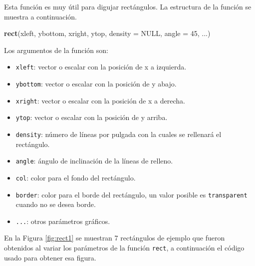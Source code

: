 \documentclass[10pt,]{krantz}
\makeatletter
\newenvironment{Shaded}{\begin{snugshade}}{\end{snugshade}}
\newcommand{\KeywordTok}[1]{\textcolor[rgb]{0.13,0.29,0.53}{\textbf{#1}}}
\newcommand{\DataTypeTok}[1]{\textcolor[rgb]{0.13,0.29,0.53}{#1}}
\newcommand{\DecValTok}[1]{\textcolor[rgb]{0.00,0.00,0.81}{#1}}
\newcommand{\OtherTok}[1]{\textcolor[rgb]{0.56,0.35,0.01}{#1}}
\newcommand{\NormalTok}[1]{#1}
\providecommand{\tightlist}{%
  \setlength{\itemsep}{0pt}\setlength{\parskip}{0pt}}
\newenvironment{kframe}{%
\medskip{}
\setlength{\fboxsep}{.8em}
 \def\at@end@of@kframe{}%
 \ifinner\ifhmode%
  \def\at@end@of@kframe{\end{minipage}}%
  \begin{minipage}{\columnwidth}%
 \fi\fi%
 \def\FrameCommand##1{\hskip\@totalleftmargin \hskip-\fboxsep
 \colorbox{shadecolor}{##1}\hskip-\fboxsep
     \hskip-\linewidth \hskip-\@totalleftmargin \hskip\columnwidth}%
 \MakeFramed {\advance\hsize-\width
   \@totalleftmargin\z@ \linewidth\hsize
   \@setminipage}}%
 {\par\unskip\endMakeFramed%
 \at@end@of@kframe}
\renewenvironment{Shaded}{\begin{kframe}}{\end{kframe}}
\makeatother
\begin{document}
Esta función es muy útil para digujar rectángulos. La estructura de la
función se muestra a continuación.

\begin{Shaded}
\begin{Highlighting}[]
\KeywordTok{rect}\NormalTok{(xleft, ybottom, xright, ytop,}
     \DataTypeTok{density =} \OtherTok{NULL}\NormalTok{, }\DataTypeTok{angle =} \DecValTok{45}\NormalTok{, ...)}
\end{Highlighting}
\end{Shaded}

Los argumentos de la función son:

\begin{itemize}
\tightlist
\item
  \texttt{xleft}: vector o escalar con la posición de x a izquierda.
\item
  \texttt{ybottom}: vector o escalar con la posición de y abajo.
\item
  \texttt{xright}: vector o escalar con la posición de x a derecha.
\item
  \texttt{ytop}: vector o escalar con la posición de y arriba.
\item
  \texttt{density}: número de líneas por pulgada con la cuales se
  rellenará el rectángulo.
\item
  \texttt{angle}: ángulo de inclinación de la líneas de relleno.
\item
  \texttt{col}: color para el fondo del rectángulo.
\item
  \texttt{border}: color para el borde del rectángulo, un valor posible
  es \texttt{\textquotesingle{}transparent\textquotesingle{}} cuando no
  se desea borde.
\item
  \texttt{...}: otros parámetros gráficos.
\end{itemize}

En la Figura \ref{fig:rect1} se muestran 7 rectángulos de ejemplo que
fueron obtenidos al variar los parámetros de la función \texttt{rect}, a
continuación el código usado para obtener esa figura.
\end{document}
